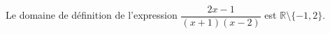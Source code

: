 Le domaine de définition de l'expression $\dfrac{2x-1}{(x+1)(x-2)}$ est $\mathbb R \setminus \{-1,2\}$.

\begin{reponses}
\end{reponses}

